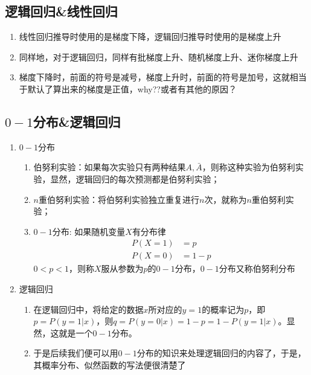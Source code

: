 \begin{enumerate}
\begin{enumerate}
\begin{enumerate}
		\end{enumerate}
	\end{enumerate}

\end{enumerate}

\subsection{逻辑回归\&线性回归}
\begin{enumerate}
	\item 线性回归推导时使用的是梯度下降，逻辑回归推导时使用的是梯度上升
	\item 同样地，对于逻辑回归，同样有批梯度上升、随机梯度上升、迷你梯度上升
	\item 梯度下降时，前面的符号是减号，梯度上升时，前面的符号是加号，这就相当于默认了算出来的梯度是正值，why??或者有其他的原因？
\end{enumerate}


\subsection{$0-1$分布\&逻辑回归}
{\color{red}{以下内容正确性待验证}}
\begin{enumerate}
	\item $0-1$分布
	\begin{enumerate}
		\item 伯努利实验：如果每次实验只有两种结果$A, \bar A$，则称这种实验为伯努利实验，显然，逻辑回归的每次预测都是伯努利实验；
		\item $n$重伯努利实验：将伯努利实验独立重复进行$n$次，就称为$n$重伯努利实验；
		\item $0-1$分布: 如果随机变量$X$有分布律
		\begin{align}
			P(X=1) &= p \\
			P(X=0) &= 1-p
		\end{align}
		$0<p<1$，则称$X$服从参数为$p$的$0-1$分布，$0-1$分布又称伯努利分布
	\end{enumerate}

	\item 逻辑回归
	\begin{enumerate}
		\item 在逻辑回归中，将给定的数据$x$所对应的$y=1$的概率记为$p$，即$p=P(y=1|x)$，则$q=P(y=0|x)=1-p=1-P(y=1|x)$。显然，这就是一个$0-1$分布。
		\item 于是后续我们便可以用$0-1$分布的知识来处理逻辑回归的内容了，于是，其概率分布、似然函数的写法便很清楚了
	\end{enumerate}
\end{enumerate}


















